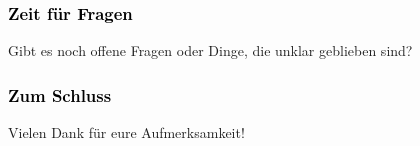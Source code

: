 \documentclass[xcolor=dvipsnames]{beamer}
\begin{document}
\addtocounter{framenumber}{-3}


\begin{frame}[plain]
\frametitle{\textcolor{black}{Zeit für Fragen}}
Gibt es noch offene Fragen oder Dinge, die unklar geblieben sind?
\end{frame}

\begin{frame}[plain]
\frametitle{\textcolor{black}{Zum Schluss}}
Vielen Dank für eure Aufmerksamkeit!
\end{frame}

\end{document}
